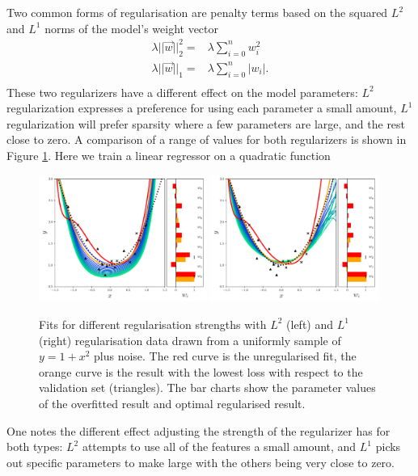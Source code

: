 Two common forms of regularisation are penalty terms based on the squared $L^{2}$ and $L^{1}$ norms of the model's weight vector
\begin{equation}
    \begin{split}
        \lambda||\vec{w}||^{2}_{2} =& \lambda\sum_{i=0}^{n}w_{i}^{2} \\
        \lambda||\vec{w}||_{1} =& \lambda\sum_{i=0}^{n}|w_{i}|. \\
    \end{split}
\end{equation}
These two regularizers have a different effect on the model parameters: $L^{2}$ regularization expresses a preference for using each parameter a small amount, $L^{1}$ regularization will prefer sparsity where a few parameters are large, and the rest close to zero. 
A comparison of a range of values for both regularizers is shown in Figure \ref{fig:machine_learning:reg_example}. Here we train a linear regressor on a quadratic function
\begin{figure}[h!]
    \begin{center}
        \includegraphics[width=0.49\textwidth]{figures/machine_learning/L2_reg_plot.pdf}
        \includegraphics[width=0.49\textwidth]{figures/machine_learning/L1_reg_plot.pdf}
    \end{center}
    \caption{Fits for different regularisation strengths with $L^{2}$ (left) and $L^{1}$ (right) regularisation data drawn from a uniformly sample of $y=1+x^{2}$ plus noise. The red curve is the unregularised fit, the orange curve is the result with the lowest loss with respect to the validation set (triangles). The bar charts show the parameter values of the overfitted result and optimal regularised result.} 
        \label{fig:machine_learning:reg_example}
\end{figure}
One notes the different effect adjusting the strength of the regularizer has for both types: $L^{2}$ attempts to use all of the features a small amount, and $L^{1}$ picks out specific parameters to make large with the others being very close to zero. 

